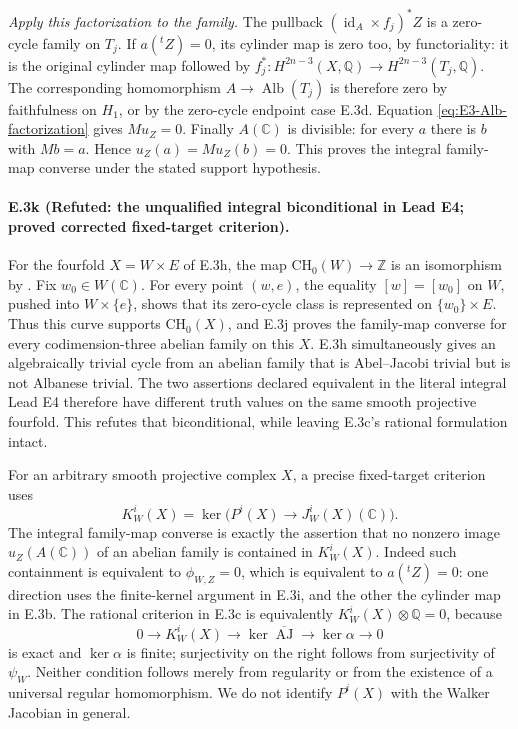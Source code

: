 \emph{Apply this factorization to the family.}
The pullback $(\operatorname{id}_A\times f_j)^*Z$ is a
zero-cycle family on $T_j$. If $a({}^tZ)=0$, its cylinder map
is zero too, by functoriality: it is the original cylinder
map followed by
$f_j^*:H^{2n-3}(X,\mathbb Q)\to H^{2n-3}(T_j,\mathbb Q)$.
The corresponding homomorphism
$A\to\operatorname{Alb}(T_j)$ is therefore zero by faithfulness
on $H_1$, or by the zero-cycle endpoint case E.3d.
Equation \eqref{eq:E3-Alb-factorization} gives $M u_Z=0$.
Finally $A(\mathbb C)$ is divisible: for every $a$ there is
$b$ with $Mb=a$. Hence $u_Z(a)=M u_Z(b)=0$. This proves
the integral family-map converse under the stated support
hypothesis.

\paragraph{E.3k (Refuted: the unqualified integral biconditional in Lead E4;
proved corrected fixed-target criterion).}
For the fourfold $X=W\times E$ of E.3h, the map
$\mathrm{CH}_0(W)\to\mathbb Z$ is an isomorphism by
\citet[Lemma 2.4, author p.~4]{cyOttemSuzuki2020}.
Fix $w_0\in W(\mathbb C)$. For every point $(w,e)$,
the equality $[w]=[w_0]$ on $W$, pushed into $W\times\{e\}$,
shows that its zero-cycle class is represented on
$\{w_0\}\times E$. Thus this curve supports
$\mathrm{CH}_0(X)$, and E.3j proves the family-map converse
for every codimension-three abelian family on this $X$.
E.3h simultaneously gives an algebraically trivial cycle from
an abelian family that is Abel--Jacobi trivial but is not
Albanese trivial. The two assertions declared equivalent in
the literal integral Lead E4 therefore have different truth
values on the same smooth projective fourfold. This refutes
that biconditional, while leaving E.3c's rational formulation
intact.

For an arbitrary smooth projective complex $X$, a precise
fixed-target criterion uses
\[
 K_W^i(X)=\ker\bigl(P^i(X)\longrightarrow J_W^i(X)(\mathbb C)\bigr).
\]
The integral family-map converse is exactly the assertion
that no nonzero image $u_Z(A(\mathbb C))$ of an abelian family
is contained in $K_W^i(X)$. Indeed such containment is
equivalent to $\phi_{W,Z}=0$, which is equivalent to
$a({}^tZ)=0$: one direction uses the finite-kernel argument
in E.3i, and the other the cylinder map in E.3b.
The rational criterion in E.3c is equivalently
$K_W^i(X)\otimes\mathbb Q=0$, because
\[
 0\longrightarrow K_W^i(X)\longrightarrow
 \ker\overline{\operatorname{AJ}}
 \longrightarrow\ker\alpha\longrightarrow0
\]
is exact and $\ker\alpha$ is finite; surjectivity on the right
follows from surjectivity of $\psi_W$.
Neither condition follows merely from regularity or from the
existence of a universal regular homomorphism. We do not
identify $P^i(X)$ with the Walker Jacobian in general.

